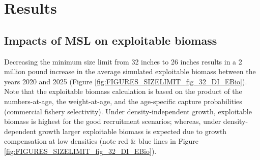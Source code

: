 \section{Results} %
\label{sec:results}

\subsection{Impacts of MSL on exploitable biomass} %
\label{sub:impacts_of_msl_on_exploitable_biomass}

Decreasing the minimum size limit from 32 inches to 26 inches results in a 2 million pound increase in the average simulated exploitable biomass between the years 2020 and 2025 (Figure \ref{fig:FIGURES_SIZELIMIT_fig_32_DI_EBio}).  Note that the exploitable biomass calculation is based on the product of the numbers-at-age, the weight-at-age, and the age-specific capture probabilities (commercial fishery selectivity).  Under density-independent growth, exploitable biomass is highest for the good recruitment scenarios; whereas, under density-dependent growth larger exploitable biomass is expected due to growth compensation at low densities (note red \& blue lines in Figure \ref{fig:FIGURES_SIZELIMIT_fig_32_DI_EBio}).  



